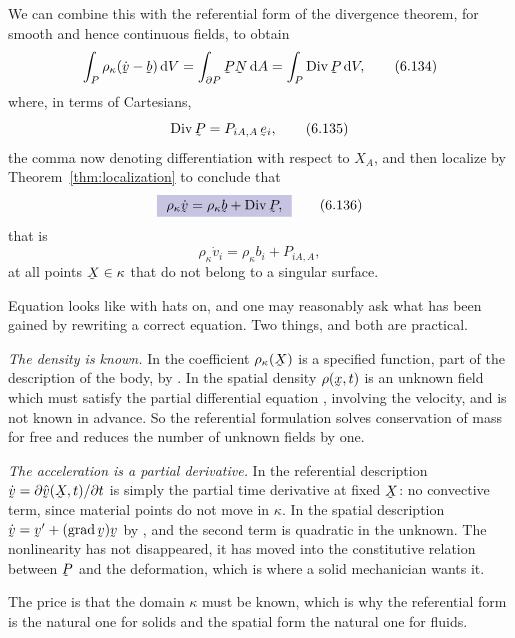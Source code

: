 We can combine this with the referential form of the divergence
theorem, for smooth and hence continuous fields, to obtain
\begin{equation}
   \int_{P}\rho_{\kappa}(\dot\bv-\bb)\,\dl V
   =\int_{\partial P}\bP\bN\,\dl A=\int_{P}\Dvg\bP\,\dl V ,
   \tag{6.134}\label{eq:6.134}
\end{equation}
where, in terms of Cartesians,
\begin{equation}
   \Dvg\bP=P_{iA,A}\,\be_{i},
   \tag{6.135}\label{eq:6.135}
\end{equation}
the comma now denoting differentiation with respect to $X_{A}$, and
then localize by Theorem~\ref{thm:localization} to conclude that
\begin{equation}
   \boxed{\ \rho_{\kappa}\dot\bv=\rho_{\kappa}\bb+\Dvg\bP ,\ }
   \tag{6.136}\label{eq:6.136}
\end{equation}
that is
\begin{equation}
   \rho_{\kappa}\dot v_{i}=\rho_{\kappa}b_{i}+P_{iA,A},
   \tag{6.137}\label{eq:6.137}
\end{equation}
at all points $\bX\in\kappa$ that do not belong to a singular surface.


\begin{remark}\label{rem:ch6whyref}
Equation  looks like  with hats on, and one may
reasonably ask what has been gained by rewriting a correct equation.
Two things, and both are practical.

\emph{The density is known.} In  the coefficient
$\rho_{\kappa}(\bX)$ is a specified function, part of the description
of the body, by . In  the spatial density
$\rho(\bx,t)$ is an unknown field which must satisfy the partial
differential equation , involving the velocity, and is not
known in advance. So the referential formulation solves conservation of
mass for free and reduces the number of unknown fields by one.

\emph{The acceleration is a partial derivative.} In the referential
description $\dot\bv=\partial\hat\bv(\bX,t)/\partial t$ is simply the
partial time derivative at fixed $\bX$: no convective term, since
material points do not move in $\kappa$. In the spatial description
$\dot\bv=\bv'+(\grad\bv)\bv$ by , and the second term is
quadratic in the unknown. The nonlinearity has not disappeared, it has
moved into the constitutive relation between $\bP$ and the
deformation, which is where a solid mechanician wants it.

The price is that the domain $\kappa$ must be known, which is why the
referential form is the natural one for solids and the spatial form the
natural one for fluids.
\end{remark}

